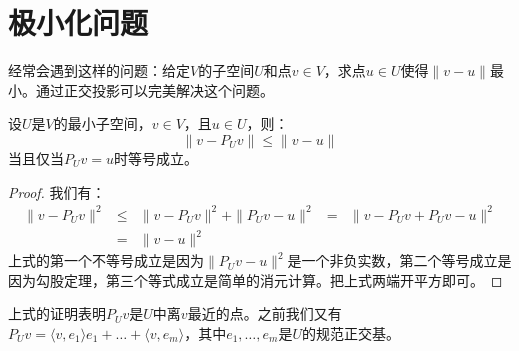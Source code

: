 \documentclass[10pt,a4paper,UTF8]{article}
\begin{document}
\section{极小化问题}
\label{sec:org24c64c4}


经常会遇到这样的问题：给定\(V\)的子空间\(U\)和点\(v\in V\)，求点\(u\in U\)使得\(\| v-u \|\)最小。通过正交投影可以完美解决这个问题。

\begin{theorem}
设\(U\)是\(V\)的最小子空间，\(v\in V\)，且\(u\in U\)，则：
\begin{equation}
\label{eq:8}
\| v - P_{U}v \| \leq \| v - u \|
\end{equation}
当且仅当\(P_{U}v = u\)时等号成立。
\end{theorem}

\begin{proof}
我们有：
\begin{eqnarray}
\label{eq:9}
\| v- P_{U}v \|^{2} &\leq&    \| v- P_{U}v \|^{2} + \|  P_{U}v - u \|^{2}
&=&  \| v - P_{U}v + P_{U}v - u \|^{2} \\
&=& \| v - u \|^{2}
\end{eqnarray}
上式的第一个不等号成立是因为\(\| P_{U}v - u \|^{2}\)是一个非负实数，第二个等号成立是因为勾股定理，第三个等式成立是简单的消元计算。把上式两端开平方即可。
\end{proof}

上式的证明表明\(P_{U}v\)是\(U\)中离\(v\)最近的点。之前我们又有\(P_{U}v = \langle v,e_{1} \rangle e_{1} + \ldots + \langle v,e_{m} \rangle\)，其中\(e_{1},\ldots ,e_{m}\)是\(U\)的规范正交基。
\end{document}

